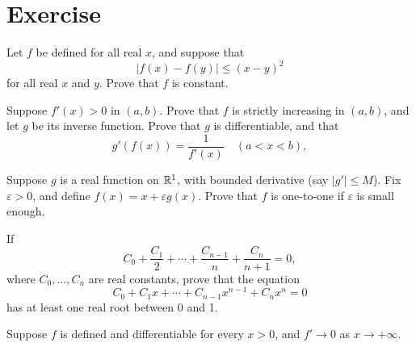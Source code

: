 
\section*{Exercise}


\begin{myExercise}
    \label{ex:5.1}
    Let $f$ be defined for all real $x$, and suppose that 
    \begin{equation*}
        \left| f(x) - f(y) \right| \leq (x-y)^2
    \end{equation*}
    for all real $x$ and $y$.
    Prove that $f$ is constant.
\end{myExercise}


\begin{myExercise}
    \label{ex:5.2}
    Suppose $f'(x)>0$ in $(a,b)$.
    Prove that $f$ is strictly increasing in $(a,b)$,
    and let $g$ be its inverse function.
    Prove that $g$ is differentiable, 
    and that 
    \begin{equation*}
        g'(f(x)) = \frac{1}{f'(x)}
        \quad 
        (a<x<b),
    \end{equation*}
\end{myExercise}


\begin{myExercise}
    \label{ex:5.3}
    Suppose $g$ is a real function on ${\protect\mathbb R}^1$, 
    with bounded derivative (say $|g'|\leq M$).
    Fix $\varepsilon > 0$, and define $f(x) = x + \varepsilon g(x)$.
    Prove that $f$ is one-to-one if $\varepsilon$ is small enough.
\end{myExercise}


\begin{myExercise}
    \label{ex:5.4}
    If 
    \begin{equation*}
        C_0 + \frac{C_1}{2} + \cdots + \frac{C_{n-1}}{n} + \frac{C_n}{n+1} = 0,
    \end{equation*}
    where $C_0,...,C_n$ are real constants,
    prove that the equation 
    \begin{equation*}
        C_0 + C_1 x + \cdots + C_{n-1} x^{n-1} + C_n x^n = 0
    \end{equation*}
    has at least one real root between 0 and 1.
\end{myExercise}


\begin{myExercise}
    \label{ex:5.5}
    Suppose $f$ is defined and differentiable for every $x>0$,
    and $f' \rightarrow 0$ as $x\rightarrow + \infty$.
\end{myExercise}


